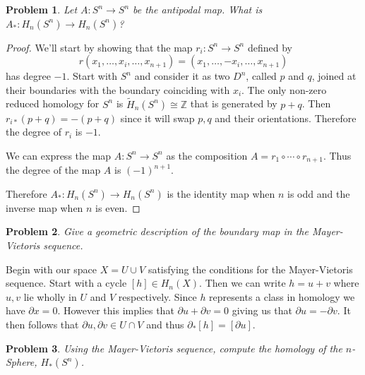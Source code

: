 \documentclass[10pt]{article}
\newcommand{\sk}{\vskip 10mm}
\newcommand{\bb}[1]{\mathbb{#1}}
\newcommand{\wt}[1]{\widetilde{#1}}
\theoremstyle{plain}
\newtheorem{problem}{Problem}
\theoremstyle{remark}
\begin{document}
\sk

\begin{problem}
  Let $A: S^n \to S^n$ be the antipodal map. What is $A_\ast : H_n(S^n) \to H_n(S^n)$?
\end{problem}

\begin{proof}
  We'll start by showing that the map $r_i:S^n\rightarrow S^n$ defined by
  \[ r(x_1,\ldots,x_i,\ldots,x_{n+1})=(x_1,\ldots,-x_i,\ldots,x_{n+1})\]
  has degree $-1$. Start with $S^n$ and consider it as two $D^n$, called $p$ and $q$,
  joined at their boundaries with the boundary coinciding with $x_i$.
  The only non-zero reduced homology for $S^n$
  is $\wt{H}_n(S^n)\cong\bb{Z}$ that is generated by $p+q$. Then $r_{i*}(p+q)=-(p+q)$
  since it will swap $p,q$ and their orientations. Therefore the degree of $r_i$
  is $-1$.

  We can express the map $A:S^n\rightarrow S^n$ as the composition $A=r_1\circ\cdots\circ r_{n+1}$. Thus the
  degree of the map $A$ is $(-1)^{n+1}$.

  Therefore $A_*:H_n(S^n)\rightarrow H_n(S^n)$ is the identity map when $n$ is odd and the
  inverse map when $n$ is even.
\end{proof}

\sk

\begin{problem}
  Give a geometric description of the boundary map in the Mayer-Vietoris sequence.
\end{problem}

Begin with our space $X=U\cup V$ satisfying the conditions for the Mayer-Vietoris
sequence. Start with a cycle $[h]\in H_n(X)$. Then we can write $h=u+v$ where $u,v$
lie wholly in $U$ and $V$ respectively. Since $h$ represents a class in homology
we have $\partial x = 0$. However this implies that $\partial u+\partial v = 0$ giving us that
$\partial u = -\partial v$. It then follows that $\partial u,\partial v\in U\cap V$ and thus $\partial_*[h]=[\partial u]$.

\sk

\begin{problem}
  Using the Mayer-Vietoris sequence, compute the homology of the $n$-Sphere, $H_\ast (S^n)$.
\end{problem}
\end{document}
